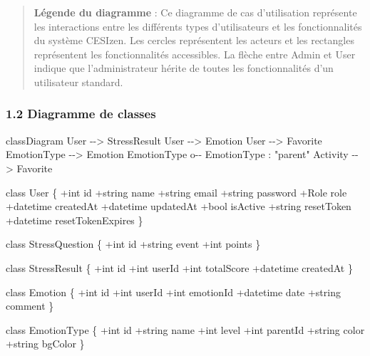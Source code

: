 \documentclass[
]{article}
\newenvironment{Shaded}{}{}
\newcommand{\NormalTok}[1]{#1}
\begin{document}
\begin{quote}
\textbf{Légende du diagramme} : Ce diagramme de cas d’utilisation
représente les interactions entre les différents types d’utilisateurs et
les fonctionnalités du système CESIzen. Les cercles représentent les
acteurs et les rectangles représentent les fonctionnalités accessibles.
La flèche entre Admin et User indique que l’administrateur hérite de
toutes les fonctionnalités d’un utilisateur standard.
\end{quote}

\subsubsection{1.2 Diagramme de classes}\label{diagramme-de-classes}

\begin{Shaded}
\begin{Highlighting}[]
\NormalTok{classDiagram}
\NormalTok{    User {-}{-}\textgreater{} StressResult}
\NormalTok{    User {-}{-}\textgreater{} Emotion}
\NormalTok{    User {-}{-}\textgreater{} Favorite}
\NormalTok{    EmotionType {-}{-}\textgreater{} Emotion}
\NormalTok{    EmotionType o{-}{-} EmotionType : "parent"}
\NormalTok{    Activity {-}{-}\textgreater{} Favorite}
    
\NormalTok{    class User \{}
\NormalTok{        +int id}
\NormalTok{        +string name}
\NormalTok{        +string email}
\NormalTok{        +string password}
\NormalTok{        +Role role}
\NormalTok{        +datetime createdAt}
\NormalTok{        +datetime updatedAt}
\NormalTok{        +bool isActive}
\NormalTok{        +string resetToken}
\NormalTok{        +datetime resetTokenExpires}
\NormalTok{    \}}
    
\NormalTok{    class StressQuestion \{}
\NormalTok{        +int id}
\NormalTok{        +string event}
\NormalTok{        +int points}
\NormalTok{    \}}
    
\NormalTok{    class StressResult \{}
\NormalTok{        +int id}
\NormalTok{        +int userId}
\NormalTok{        +int totalScore}
\NormalTok{        +datetime createdAt}
\NormalTok{    \}}
    
\NormalTok{    class Emotion \{}
\NormalTok{        +int id}
\NormalTok{        +int userId}
\NormalTok{        +int emotionId}
\NormalTok{        +datetime date}
\NormalTok{        +string comment}
\NormalTok{    \}}
    
\NormalTok{    class EmotionType \{}
\NormalTok{        +int id}
\NormalTok{        +string name}
\NormalTok{        +int level}
\NormalTok{        +int parentId}
\NormalTok{        +string color}
\NormalTok{        +string bgColor}
\NormalTok{    \}}
    

\end{Highlighting}
\end{Shaded}
\end{document}
